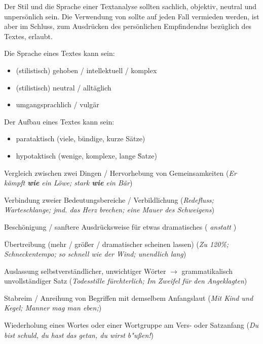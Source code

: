 
Der Stil und die Sprache einer Textanalyse sollten sachlich, objektiv, neutral und unpers\"{o}nlich sein. Die Verwendung von  sollte auf jeden Fall vermieden werden, ist aber im Schluss, zum Ausdr\"{u}cken des pers\"{o}nlichen Empfindendns bez\"{u}glich des Textes, erlaubt. 


Die Sprache eines Textes kann sein:

\begin{itemize}
	\item (stilistisch) gehoben / intellektuell / komplex
	\item (stilistisch) neutral / allt\"{a}glich
	\item umgangsprachlich / vulg\"{a}r
\end{itemize}

Der Aufbau eines Textes kann sein:

\begin{itemize}
	\item parataktisch (viele, b\"{u}ndige, kurze S\"{a}tze)
	\item hypotaktisch (wenige, komplexe, lange S\"{}atze)
\end{itemize}

\pagebreak


\begin{itemize}
	 Vergleich zwischen zwei Dingen / Hervorhebung von Gemeinsamkeiten (\emph{Er k\"{a}mpft \textbf{wie} ein L\"{o}we; stark \textbf{wie} ein B\"{a}r})

	 Verbindung zweier Bedeutungsbereiche / Verbildlichung (\emph{Redefluss; Warteschlange; jmd. das Herz brechen; eine Mauer des Schweigens})

	 Besch\"{o}nigung / sanftere Ausdr\"{u}cksweise f\"{u}r etwas dramatisches (\emph{ anstatt })

	 \"{U}bertreibung (mehr / gr\"{o}\ss{}er / dramatischer scheinen lassen) (\emph{Zu 120\%; Schneckentempo; so schnell wie der Wind; unendlich lang})

	 Auslassung selbstverst\"{a}ndlicher, unwichtiger W\"{o}rter $\rightarrow$ grammatikalisch unvollst\"{a}ndiger Satz (\emph{Todesstille f\"{u}rchterlich; Im Zweifel f\"{u}r den Angeklagten})

	 Stabreim / Anreihung von Begriffen mit demselbem Anfangslaut (\emph{Mit Kind und Kegel; Manner mag man eben;})

	 Wiederholung eines Wortes oder einer Wortgruppe am Vers- oder Satzanfang (\emph{Du bist schuld, du hast das getan, du wirst b"{u}\ss{}en!}) 
\end{itemize}


